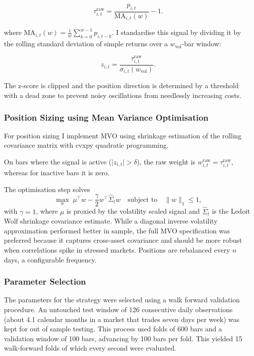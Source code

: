 \documentclass[10pt,a4paper]{article}
\begin{document}
\begin{equation}
    \tau^{\mathrm{raw}}_{i,t} = \frac{p_{i,t}}{\mathrm{MA}_{i,t}(w)} - 1.
\end{equation}

where $\mathrm{MA}_{i,t}(w)=\frac{1}{w}\sum_{k=0}^{w-1} p_{i,t-k}$.
I standardise this signal by dividing it by the rolling standard deviation of simple returns over a $w_{\mathrm{vol}}$-bar window:

\begin{equation}
    z_{i,t} = \frac{\tau^{\mathrm{raw}}_{i,t}}{\sigma_{i,t}(w_{\mathrm{vol}})}.
\end{equation}

The z-score is clipped and the position direction is determined by a threshold with a dead zone to prevent noisy oscillations from needlessly increasing costs.

\subsubsection{Position Sizing using Mean Variance Optimisation}

For position sizing I implement MVO using shrinkage estimation of the rolling covariance matrix \citep{ledoit2004} with cvxpy quadratic programming.

On bars where the signal is active ($\lvert z_{i,t} \rvert > \delta$), the raw weight is $w^{\mathrm{raw}}_{i,t} = \tau^{\mathrm{raw}}_{i,t}$, whereas for inactive bars it is zero.

The optimisation step solves
\[
\max_w \; \mu^\top w - \frac{\gamma}{2} w^\top \hat{\Sigma}_t w
\quad \text{subject to} \quad \|w\|_1 \leq 1,
\]
with $\gamma = 1$, where $\mu$ is proxied by the volatility scaled signal and $\hat{\Sigma}_t$ is the Ledoit Wolf shrinkage covariance estimate. While a diagonal inverse volatility approximation performed better in sample, the full MVO specification was preferred because it captures cross-asset covariance and should be more robust when correlations spike in stressed markets. Positions are rebalanced every $n$ days, a configurable frequency.

\subsubsection{Parameter Selection}

The parameters for the strategy were selected using a walk forward validation procedure. An untouched test window of 126 consecutive daily observations (about 4.1 calendar months in a market that trades seven days per week) was kept for out of sample testing. This process used folds of 600 bars and a validation window of 100 bars, advancing by 100 bars per fold. This yielded 15 walk-forward folds of which every second were evaluated.
\end{document}
